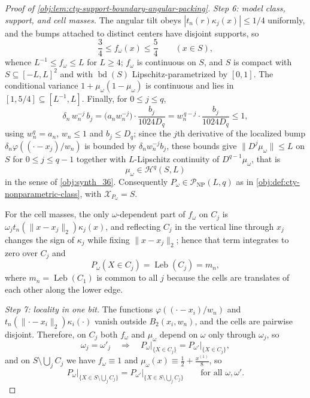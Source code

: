 \begin{proof}[Proof of \cref{obj:lem:cty-support-boundary-angular-packing}]
\emph{Step 6: model class, support, and cell masses.}  The angular tilt obeys \(|t_n(r)\kappa_j(x)|\le1/4\) uniformly, and the bumps attached to distinct centers have disjoint supports, so
\[
\frac34\le f_\omega(x)\le\frac54
\qquad (x\in S),
\]
whence \(L^{-1}\le f_\omega\le L\) for \(L\ge4\); \(f_\omega\) is continuous on \(S\), and \(S\) is compact with \(S\subseteq[-L,L]^2\) and with \(\operatorname{bd}(S)\) Lipschitz-parametrized by \([0,1]\).  The conditional variance \(1+\mu_\omega(1-\mu_\omega)\) is continuous and lies in \([1,5/4]\subseteq[L^{-1},L]\).  Finally, for \(0\le j\le q\),
\[
\delta_n\,w_n^{-j}\,b_j
=
\bigl(a_nw_n^{-j}\bigr)\cdot\frac{b_j}{1024D_q}
=
w_n^{\,q-j}\cdot\frac{b_j}{1024D_q}
\le 1,
\]
using \(w_n^{q}=a_n\), \(w_n\le1\) and \(b_j\le D_q\); since the \(j\)th derivative of the localized bump \(\delta_n\varphi((\cdot-x_j)/w_n)\) is bounded by \(\delta_nw_n^{-j}b_j\), these bounds give \(\lVert D^j\mu_\omega\rVert\le L\) on \(S\) for \(0\le j\le q-1\) together with \(L\)-Lipschitz continuity of \(D^{q-1}\mu_\omega\), that is
\[
\mu_\omega\in\mathcal H^q(S,L)
\]
in the sense of \cref{obj:synth_36}.  Consequently \(P_\omega\in\mathcal P_{\mathrm{NP}}(L,q)\) as in \cref{obj:def:cty-nonparametric-class}, with \(\mathcal X_{P_\omega}=S\).

For the cell masses, the only \(\omega\)-dependent part of \(f_\omega\) on \(C_j\) is \(\omega_jt_n(\lVert x-x_j\rVert_2)\kappa_j(x)\), and reflecting \(C_j\) in the vertical line through \(x_j\) changes the sign of \(\kappa_j\) while fixing \(\lVert x-x_j\rVert_2\); hence that term integrates to zero over \(C_j\) and
\[
P_\omega(X\in C_j)=\operatorname{Leb}(C_j)=m_n ,
\]
where \(m_n=\operatorname{Leb}(C_1)\) is common to all \(j\) because the cells are translates of each other along the lower edge.

\emph{Step 7: locality in one bit.}  The functions \(\varphi((\cdot-x_i)/w_n)\) and \(t_n(\lVert\cdot-x_i\rVert_2)\kappa_i(\cdot)\) vanish outside \(B_2(x_i,w_n)\), and the cells are pairwise disjoint.  Therefore, on \(C_j\) both \(f_\omega\) and \(\mu_\omega\) depend on \(\omega\) only through \(\omega_j\), so
\[
\omega_j=\omega'_j
\quad\Longrightarrow\quad
P_\omega\big|_{\{X\in C_j\}}=P_{\omega'}\big|_{\{X\in C_j\}},
\]
and on \(S\setminus\bigcup_jC_j\) we have \(f_\omega\equiv1\) and \(\mu_\omega(x)\equiv\tfrac12+\tfrac{x^{(1)}}{8}\), so
\[
P_\omega\big|_{\{X\in S\setminus\bigcup_jC_j\}}
=
P_{\omega'}\big|_{\{X\in S\setminus\bigcup_jC_j\}}
\qquad\text{for all }\omega,\omega' .
\]


\end{proof}
